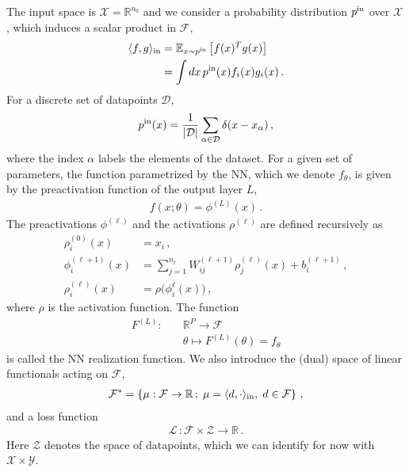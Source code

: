 \documentclass[11pt]{article}
\begin{document}
The input space is
$\mathcal{X}=\mathbb{R}^{n_0}$ and we consider a probability distribution
$p^{\text{in}}$ over $\mathcal{X}$, which induces a scalar product in
$\mathcal{F}$,
\begin{align}
    \label{eq:ScalProdX}
    \langle f, g\rangle_{\text{in}} &= 
        \mathbb{E}_{x\sim p^{\text{in}}} \left[f(x)^T g(x)\right] \\
        &= \int dx\, p^{\text{in}}(x) f_i(x) g_i(x)\, .
\end{align}
For a discrete set of datapoints $\mathcal{D}$, 
\begin{align}
    p^{\text{in}}(x) = \frac{1}{|\mathcal{D}|} \sum_{\alpha\in\mathcal{D}} 
        \delta(x-x_{\alpha})\, ,
\end{align}
where the index $\alpha$ labels the elements of the dataset. For a given set of
parameters, the function parametrized by the NN, which we denote $f_{\theta}$, is given by the
preactivation function of the output layer $L$,
\begin{align}
    f(x;\theta) = \phi^{(L)}(x)\, .
\end{align}
The preactivations $\phi^{(\ell)}$ and the activations $\rho^{(\ell)}$ are
defined recursively as
\begin{align}
    \rho^{(0)}_i(x) 
        &= x_i\, , \\
    \phi^{(\ell+1)}_i(x)
        &= \sum_{j=1}^{n_\ell} W^{(\ell+1)}_{ij} \rho^{(\ell)}_j(x) + b^{(\ell+1)}_i\, , \\
    \rho^{(\ell)}_i(x)
        &= \rho\bigl(\phi^{\ell}_i(x)\bigr)\, ,
\end{align}
where $\rho$ is the activation function. The function 
\begin{align}
    F^{(L)} 
        :\quad & \mathbb{R}^P \to \mathcal{F} \\
        & \theta \mapsto F^{(L)}(\theta) = f_{\theta}
\end{align}
is called the NN realization function. We also introduce the (dual) space of
linear functionals acting on $\mathcal{F }$,
\begin{align}
    \label{eq:FdualDef}
    \mathcal{F}^* = 
        \left\{
            \mu: \mathcal{F} \to \mathbb{R}\,; \; 
                \mu = \langle d, \cdot\rangle_{\text{in}}, \; d \in \mathcal{F}
        \right\}\, ,
\end{align}
and a loss function 
\begin{align}
    \label{eq:LossDef}
    \mathcal{L}\, : \mathcal{F}\times \mathcal{Z} \to \mathbb{R}\, .
\end{align}
Here $\mathcal{Z}$ denotes the space of datapoints, which we can identify for
now with $\mathcal{X}\times\mathcal{Y}$. 
\end{document}
